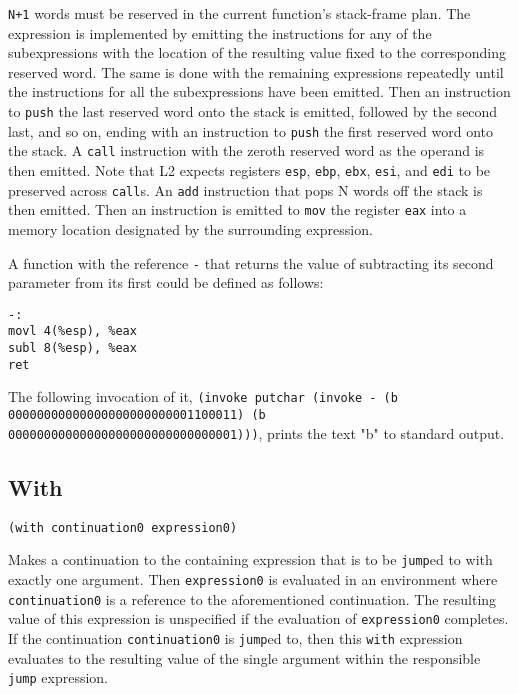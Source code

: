 \documentclass[twocolumn,landscape]{article}
\begin{document}
      \lstinline{N+1} words must be reserved in the current function's stack-frame plan. The expression is implemented by emitting the instructions for any of the subexpressions with the location of the resulting value fixed to the corresponding reserved word. The same is done with the remaining expressions repeatedly until the instructions for all the subexpressions have been emitted. Then an instruction to \lstinline{push} the last reserved word onto the stack is emitted, followed by the second last, and so on, ending with an instruction to \lstinline{push} the first reserved word onto the stack. A \lstinline{call} instruction with the zeroth reserved word as the operand is then emitted. Note that L2 expects registers \lstinline{esp}, \lstinline{ebp}, \lstinline{ebx}, \lstinline{esi}, and \lstinline{edi} to be preserved across \lstinline{call}s. An \lstinline{add} instruction that pops N words off the stack is then emitted. Then an instruction is emitted to \lstinline{mov} the register \lstinline{eax} into a memory location designated by the surrounding expression.

      A function with the reference \lstinline{-} that returns the value of subtracting its second parameter from its first could be defined as follows:
      \begin{lstlisting}
-:
movl 4(%esp), %eax
subl 8(%esp), %eax
ret
      \end{lstlisting}
      The following invocation of it, \lstinline{(invoke putchar (invoke - (b 00000000000000000000000001100011) (b 00000000000000000000000000000001)))}, prints the text "b" to standard output.

    \subsection{With}\label{sec:with}
      \begin{lstlisting}
(with continuation0 expression0)
      \end{lstlisting}
      Makes a continuation to the containing expression that is to be \lstinline{jump}ed to with exactly one argument. Then \lstinline{expression0} is evaluated in an environment where \lstinline{continuation0} is a reference to the aforementioned continuation. The resulting value of this expression is unspecified if the evaluation of \lstinline{expression0} completes. If the continuation \lstinline{continuation0} is \lstinline{jump}ed to, then this \lstinline{with} expression evaluates to the resulting value of the single argument within the responsible \lstinline{jump} expression.
\end{document}
